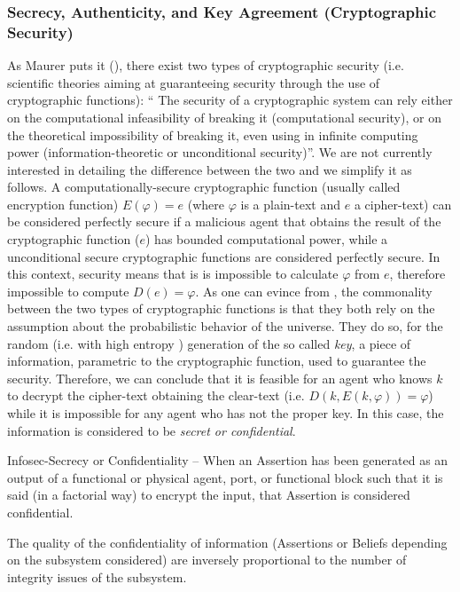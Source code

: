 \subsubsection{Secrecy, Authenticity, and Key Agreement (Cryptographic Security)}\label{sec:encryption}
As Maurer puts it (\autocite{Maurer1999information}), there exist two types of
cryptographic security (i.e. scientific theories aiming at guaranteeing
security through the use of cryptographic functions): `` The  security  of a
cryptographic system can rely either on the computational infeasibility of
breaking it (computational security), or on the theoretical impossibility of
breaking it, even using in infinite computing power (information-theoretic or
unconditional security)''. We are not currently interested in detailing the
difference between the two and we simplify it as follows. A
computationally-secure cryptographic function (usually called encryption
function) $E(\varphi)=e$ (where $\varphi$ is a plain-text and $e$ a
cipher-text) can be considered perfectly secure if a malicious agent that
obtains the result of the cryptographic function ($e$) has bounded
computational power, while a unconditional secure cryptographic functions are
considered perfectly secure. In this context, security means that is is
impossible to calculate $\varphi$ from $e$, therefore impossible to compute
$D(e)=\varphi$.  As one can evince from \autocite{Shannon1948information}, the
commonality between the two types of cryptographic functions is that they both
rely on the assumption about the probabilistic behavior of the universe. They
do so, for the random (i.e. with high entropy
\autocite{Shannon1948information}) generation of the so called \emph{key}, a
piece of information, parametric to the cryptographic function, used to
guarantee the security. Therefore, we can conclude that it is feasible for an
agent who knows $k$ to decrypt the cipher-text obtaining the clear-text (i.e. $D(k, E(k,\varphi))=\varphi$)
while it is impossible for any agent who has not the proper key. In this
case, the information is considered to be \emph{secret or confidential}.

\begin{definition}{Infosec-Secrecy or Confidentiality --}\label{def:confidentiality}
	When an Assertion has been generated as an output of a functional or
	physical agent, port, or functional block such that it is said (in a
	factorial way) to encrypt the input, that Assertion is considered
	confidential.
\end{definition}
The quality of the confidentiality of information (Assertions or Beliefs depending on 
the subsystem considered) are inversely proportional to the number of 
integrity issues of the subsystem.

